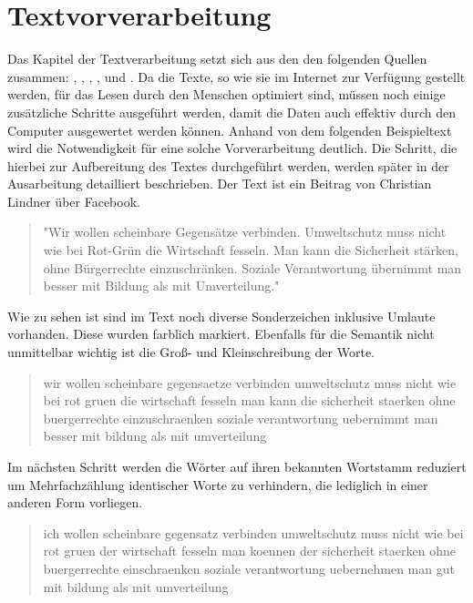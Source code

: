 \section{Textvorverarbeitung}
Das Kapitel der Textverarbeitung setzt sich aus den den folgenden Quellen zusammen: \cite{deutschinfo}, \cite{openthesaurus}, \cite{morphy}, \cite{wikipedia}, \cite{webmining} und \cite{zeichenkodierung}.
Da die Texte, so wie sie im Internet zur Verfügung gestellt werden, für das Lesen durch den Menschen optimiert sind, müssen noch einige zusätzliche Schritte ausgeführt werden, damit die Daten auch effektiv durch den Computer ausgewertet werden können. Anhand von dem folgenden Beispieltext wird die Notwendigkeit für eine solche Vorverarbeitung deutlich. Die Schritt, die hierbei zur Aufbereitung des Textes durchgeführt werden, werden später in der Ausarbeitung detailliert beschrieben. Der Text ist ein Beitrag von Christian Lindner über Facebook.
\newline
\begin{quote}
\colorbox{rahmen}{"Wir} wollen scheinbare \colorbox{rahmen}{Gegensätze} verbinden\colorbox{rahmen}{. Umweltschutz} muss nicht wie bei \colorbox{rahmen}{Rot-Grün} die \colorbox{rahmen}{Wirtschaft} fesseln\colorbox{rahmen}{. Man} kann die \colorbox{rahmen}{Sicherheit stärken}, ohne \colorbox{rahmen}{Bürgerrechte einzuschränken. Soziale Verantwortung übernimmt} man besser mit \colorbox{rahmen}{Bildung} als mit \colorbox{rahmen}{Umverteilung.}"
\end{quote}

Wie zu sehen ist sind im Text noch diverse Sonderzeichen inklusive Umlaute vorhanden. Diese wurden farblich markiert. Ebenfalls für die Semantik nicht unmittelbar wichtig ist die Groß- und Kleinschreibung der Worte.
\newline

\begin{quote}
\colorbox{rahmen}{wir} wollen scheinbare \colorbox{rahmen}{gegensaetze} verbinden umweltschutz muss nicht wie bei rot gruen \colorbox{rahmen}{die} wirtschaft fesseln man \colorbox{rahmen}{kann die} sicherheit staerken ohne buergerrechte einzuschraenken soziale verantwortung \colorbox{rahmen}{uebernimmt} man \colorbox{rahmen}{besser} mit bildung als mit umverteilung
\end{quote}

Im nächsten Schritt werden die Wörter auf ihren bekannten Wortstamm reduziert um Mehrfachzählung identischer Worte zu verhindern, die lediglich in einer anderen Form vorliegen. 
\newline
\begin{quote}
\colorbox{rahmen}{ich} wollen scheinbare gegensatz verbinden umweltschutz muss nicht \colorbox{rahmen}{wie} bei rot gruen \colorbox{rahmen}{der} wirtschaft fesseln \colorbox{rahmen}{man} koennen \colorbox{rahmen}{der} sicherheit staerken \colorbox{rahmen}{ohne} buergerrechte einschraenken soziale verantwortung uebernehmen \colorbox{rahmen}{man} gut \colorbox{rahmen}{mit} bildung \colorbox{rahmen}{als mit} umverteilung
\end{quote}

